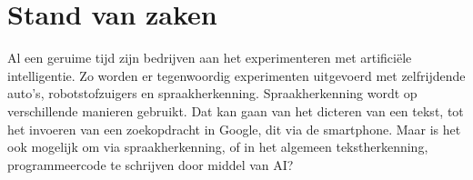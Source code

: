 \chapter{Stand van zaken}
\label{ch:stand-van-zaken}







Al een geruime tijd zijn bedrijven aan het experimenteren met artificiële intelligentie. Zo worden er tegenwoordig experimenten uitgevoerd met zelfrijdende auto's, robotstofzuigers en spraakherkenning. Spraakherkenning wordt op verschillende manieren gebruikt. Dat kan gaan van het dicteren van een tekst, tot het invoeren van een zoekopdracht in Google, dit via de smartphone. Maar is het ook mogelijk om via spraakherkenning, of in het algemeen tekstherkenning, programmeercode te schrijven door middel van AI? 

